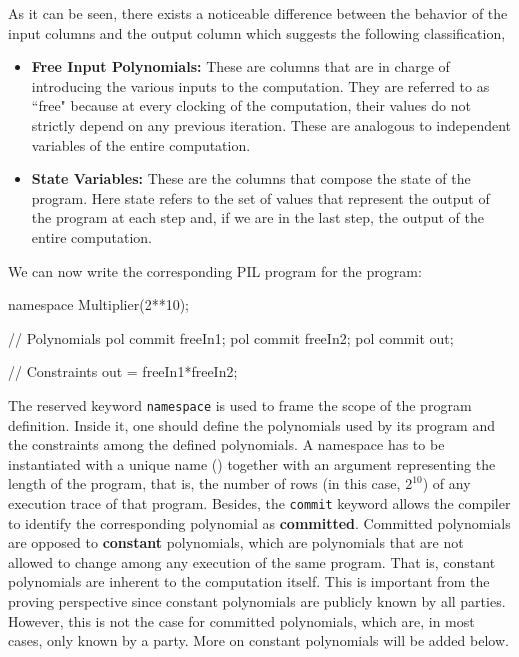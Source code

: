 As it can be seen, there exists a noticeable difference between the behavior of the input columns and the output column which suggests the following classification,
\begin{itemize}
    \item \textbf{Free Input Polynomials:} These are columns that are in charge of introducing the various inputs to the computation. They are referred to as ``free" because at every clocking of the computation, their values do not strictly depend on any previous iteration. These are analogous to independent variables of the entire computation.
    
    \item \textbf{State Variables:} These are the columns that compose the state of the program. Here state refers to the set of values that represent the output of the program at each step and, if we are in the last step, the output of the entire computation.
\end{itemize}




We can now write the corresponding PIL program for the \Multiplier program:
\begin{pil}
    namespace Multiplier(2**10);
    
    // Polynomials
    pol commit freeIn1;
    pol commit freeIn2;
    pol commit out;
    
    // Constraints
    out = freeIn1*freeIn2;
\end{pil}

The reserved keyword \texttt{namespace} is used to frame the scope of the program definition. Inside it, one should define the polynomials used by its program and the constraints among the defined polynomials. A namespace has to be instantiated with a unique name (\Multiplier) together with an argument representing the length of the program, that is, the number of rows (in this case, $2^{10}$) of any execution trace of that program. Besides, the \texttt{commit} keyword allows the compiler to identify the corresponding polynomial as \textbf{committed}. Committed polynomials are opposed to \textbf{constant} polynomials, which are polynomials that are not allowed to change among any execution of the same program. That is, constant polynomials are inherent to the computation itself. This is important from the proving perspective since constant polynomials are publicly known by all parties. However, this is not the case for committed polynomials, which are, in most cases, only known by a party. More on constant polynomials will be added below. 

